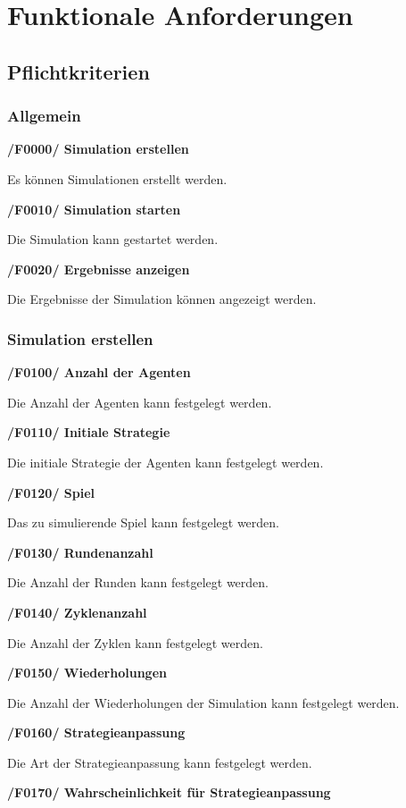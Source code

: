 \section{Funktionale Anforderungen}

\subsection{Pflichtkriterien}

\subsubsection{Allgemein}

\textbf{/F0000/ Simulation erstellen}

Es können Simulationen erstellt werden.

\textbf{/F0010/ Simulation starten}

Die Simulation kann gestartet werden.

\textbf{/F0020/ Ergebnisse anzeigen}

Die Ergebnisse der Simulation können angezeigt werden.

\subsubsection{Simulation erstellen}

\textbf{/F0100/ Anzahl der Agenten}

Die Anzahl der Agenten kann festgelegt werden.

\textbf{/F0110/ Initiale Strategie}

Die initiale Strategie der Agenten kann festgelegt werden.

\textbf{/F0120/ Spiel}

Das zu simulierende Spiel kann festgelegt werden.

\textbf{/F0130/ Rundenanzahl}

Die Anzahl der Runden kann festgelegt werden.

\textbf{/F0140/ Zyklenanzahl}

Die Anzahl der Zyklen kann festgelegt werden.

\textbf{/F0150/ Wiederholungen}

Die Anzahl der Wiederholungen der Simulation kann festgelegt werden.

\textbf{/F0160/ Strategieanpassung}

Die Art der Strategieanpassung kann festgelegt werden. 

\textbf{/F0170/ Wahrscheinlichkeit für Strategieanpassung}

